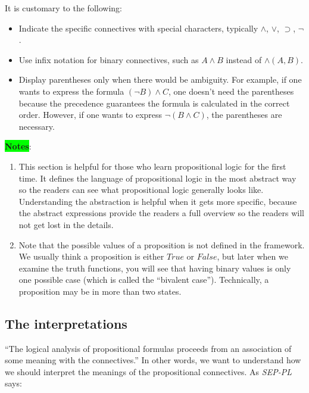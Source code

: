 \documentclass[12pt, letterpaper]{article}
\begin{document}
It is customary to the following:
\begin{itemize}
  \item Indicate the specific connectives with special characters, typically
        $\land$, $\lor$, $\supset$, $\lnot$.
  \item Use infix notation for binary connectives, such as $A \land B$ instead
        of $\land(A, B)$.
  \item Display parentheses only when there would be ambiguity. For example,
        if one wants to express the formula $(\lnot B) \land C$, one doesn't need
        the parentheses because the precedence guarantees the formula is calculated
        in the correct order. However, if one wants to express $\lnot (B \land C)$,
        the parentheses are necessary.
\end{itemize}

\colorbox{lime}{\textbf{Notes}}:
\begin{enumerate}
  \item This section is helpful for those who learn propositional logic for the
        first time. It defines the language of propositional logic in the most
        abstract way so the readers can see what propositional logic generally
        looks like. Understanding the abstraction is helpful when it gets more
        specific, because the abstract expressions provide the readers a full
        overview so the readers will not get lost in the details.
  \item Note that the possible values of a proposition is not defined in the
        framework. We usually think a proposition is either $True$ or $False$, but
        later when we examine the truth functions, you will see that having binary
        values is only one possible case (which is called the ``bivalent case'').
        Technically, a proposition may be in more than two states.
\end{enumerate}

\subsection{The interpretations}

``The logical analysis of propositional formulas proceeds from an association
of some meaning with the connectives.'' In other words, we want to understand
how we should interpret the meanings of the propositional connectives. As
\textit{SEP-PL} says:
\end{document}
